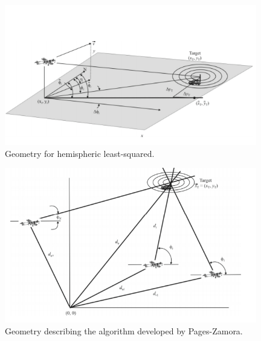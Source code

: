 \documentclass[english,purist]{ist-report}
\begin{document}
\begin{figure}[!h]
\centering
\includegraphics[width=110mm]{target11.png}
\caption{Geometry for hemispheric least-squared.}
\label{target11}
\end{figure} 


\begin{figure}[!h]
\centering
\includegraphics[width=110mm]{target12.png}
\caption{Geometry describing the algorithm developed by Pages-Zamora.}
\label{target12}
\end{figure}

\FloatBarrier
\pagebreak
\nocite{*}
\printbibliography
\end{document}
